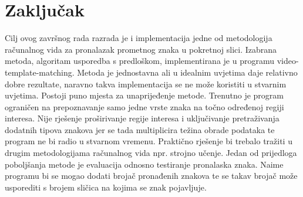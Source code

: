 \newpage
\setcounter{figure}{0}

\section{Zaključak} %
\label{sec:Zaključak}

Cilj ovog završnog rada razrada je i implementacija jedne od
metodologija računalnog vida za pronalazak prometnog znaka u pokretnoj
slici. Izabrana metoda, algoritam usporedba s predloškom, implementirana
je u programu video-template-matching. Metoda je jednostavna ali u
idealnim uvjetima daje relativno dobre rezultate, naravno takva
implementacija se ne može koristiti u stvarnim uvjetima. Postoji puno
mjesta za unaprijeđenje metode. Trenutno je program ograničen na
prepoznavanje samo jedne vrste znaka na točno određenoj regiji interesa.
Nije rješenje proširivanje regije interesa i uključivanje pretraživanja
dodatnih tipova znakova jer se tada multiplicira težina obrade podataka
te program ne bi radio u stvarnom vremenu. Praktično rješenje bi trebalo
tražiti u drugim metodologijama računalnog vida npr. strojno učenje.
Jedan od prijedloga poboljšanja metode je evaluacija odnosno testiranje
pronalaska znaka. Naime programu bi se mogao dodati brojač pronađenih
znakova te se takav brojač može usporediti s brojem sličica na kojima se
znak pojavljuje.

